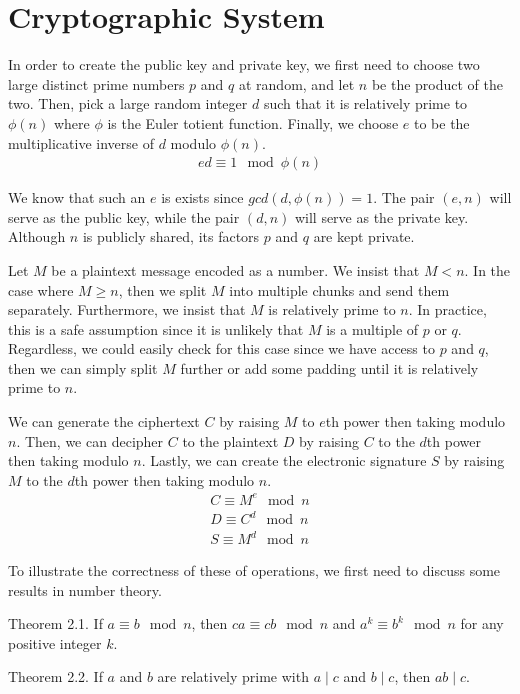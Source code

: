 \documentclass[10pt]{article}
\begin{document}
\section{Cryptographic System}
In order to create the public key and private key, we first need to choose two large distinct prime numbers $p$ and $q$ at random, and let $n$ be the product of the two. Then, pick a large random integer $d$ such that it is relatively prime to $\phi(n)$ where $\phi$ is the Euler totient function. Finally, we choose $e$ to be the multiplicative inverse of $d$ modulo $\phi(n)$.
\begin{align*}
	e d \equiv 1 \mod \phi(n)
\end{align*}

We know that such an $e$ is exists since $gcd(d, \phi(n)) = 1$. The pair $(e, n)$ will serve as the public key, while the pair $(d, n)$ will serve as the private key. Although $n$ is publicly shared, its factors $p$ and $q$ are kept private.

Let $M$ be a plaintext message encoded as a number. We insist that $M < n$. In the case where $M \geq n$, then we split $M$ into multiple chunks and send them separately. Furthermore, we insist that $M$ is relatively prime to $n$. In practice, this is a safe assumption since it is unlikely that $M$ is a multiple of $p$ or $q$. Regardless, we could easily check for this case since we have access to $p$ and $q$, then we can simply split $M$ further or add some padding until it is relatively prime to $n$.

We can generate the ciphertext $C$ by raising $M$ to $e$th power then taking modulo $n$. Then, we can decipher $C$ to the plaintext $D$ by raising $C$ to the $d$th power then taking modulo $n$. Lastly, we can create the electronic signature $S$ by raising $M$ to the $d$th power then taking modulo $n$.
\begin{align*}
    C \equiv M^e \mod n
 \\ D \equiv C^d \mod n
 \\ S \equiv M^d \mod n
\end{align*}

To illustrate the correctness of these of operations, we first need to discuss some results in number theory.


Theorem 2.1. If $a \equiv b \mod n$, then $c a \equiv c b \mod n$ and $a^k \equiv b^k \mod n$ for any positive integer $k$.

Theorem 2.2. If $a$ and $b$ are relatively prime with $a \mid c$ and $b  \mid c$, then $a b \mid c$.
\end{document}
